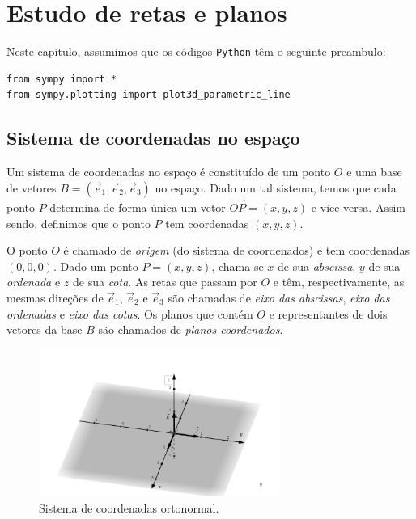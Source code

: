 
\chapter{Estudo de retas e planos}\label{cap_erp}
\thispagestyle{fancy}

\ifispython
\begin{obs}\label{obs:cap_erp_py}
  Neste capítulo, assumimos que os códigos \verb+Python+ têm o seguinte preambulo:
\begin{verbatim}
from sympy import *
from sympy.plotting import plot3d_parametric_line
\end{verbatim}
\end{obs}
\fi

\section{Sistema de coordenadas no espaço}\label{cap_erp_sec_siscoord}

Um sistema de coordenadas no espaço é constituído de um ponto $O$ e uma base de vetores $B = (\vec{e}_1, \vec{e}_2, \vec{e}_3)$ no espaço. Dado um tal sistema, temos que cada ponto $P$ determina de forma única um vetor $\overrightarrow{OP} = (x,y,z)$ e vice-versa. Assim sendo, definimos que o ponto $P$ tem coordenadas $(x,y,z)$.

O ponto $O$ é chamado de \emph{origem} (do sistema de coordenados) e tem coordenadas $(0,0,0)$. Dado um ponto $P=(x,y,z)$, chama-se $x$ de sua \emph{abscissa}, $y$ de sua \emph{ordenada} e $z$ de sua \emph{cota}. As retas que passam por $O$ e têm, respectivamente, as mesmas direções de $\vec{e}_1$, $\vec{e}_2$ e $\vec{e}_3$ são chamadas de \emph{eixo das abscissas}, \emph{eixo das ordenadas} e \emph{eixo das cotas}. Os planos que contém $O$ e representantes de dois vetores da base $B$ são chamados de \emph{planos coordenados}.

\begin{figure}[H]
  \centering
  \includegraphics[width=0.7\textwidth]{./cap_erp/dados/fig_sis_coord_orto/fig_sis_coord_orto}
  \caption{Sistema de coordenadas ortonormal.}
  \label{fig:sis_coord_orto}
\end{figure}

